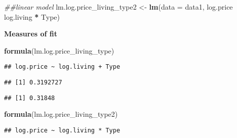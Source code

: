 \documentclass[
]{article}
\newenvironment{Shaded}{\begin{snugshade}}{\end{snugshade}}
\newcommand{\CommentTok}[1]{\textcolor[rgb]{0.56,0.35,0.01}{\textit{#1}}}
\newcommand{\DataTypeTok}[1]{\textcolor[rgb]{0.13,0.29,0.53}{#1}}
\newcommand{\KeywordTok}[1]{\textcolor[rgb]{0.13,0.29,0.53}{\textbf{#1}}}
\newcommand{\NormalTok}[1]{#1}
\newcommand{\OperatorTok}[1]{\textcolor[rgb]{0.81,0.36,0.00}{\textbf{#1}}}
\newcommand{\StringTok}[1]{\textcolor[rgb]{0.31,0.60,0.02}{#1}}
\begin{document}
\begin{Shaded}
\begin{Highlighting}[]
\CommentTok{##linear model}
\NormalTok{lm.log.price_living_type2 <-}\StringTok{ }\KeywordTok{lm}\NormalTok{(}\DataTypeTok{data =}\NormalTok{ data1, log.price }\OperatorTok{~}\StringTok{ }\NormalTok{log.living }\OperatorTok{*}\StringTok{ }\NormalTok{Type)}
\end{Highlighting}
\end{Shaded}

\textbf{Measures of fit}

\begin{Shaded}
\begin{Highlighting}[]
\KeywordTok{formula}\NormalTok{(lm.log.price_living_type)}
\end{Highlighting}
\end{Shaded}

\begin{verbatim}
## log.price ~ log.living + Type
\end{verbatim}

\begin{Shaded}
\end{Shaded}

\begin{verbatim}
## [1] 0.3192727
\end{verbatim}

\begin{Shaded}
\end{Shaded}

\begin{verbatim}
## [1] 0.31848
\end{verbatim}

\begin{Shaded}
\begin{Highlighting}[]
\KeywordTok{formula}\NormalTok{(lm.log.price_living_type2)}
\end{Highlighting}
\end{Shaded}

\begin{verbatim}
## log.price ~ log.living * Type
\end{verbatim}
\end{document}
